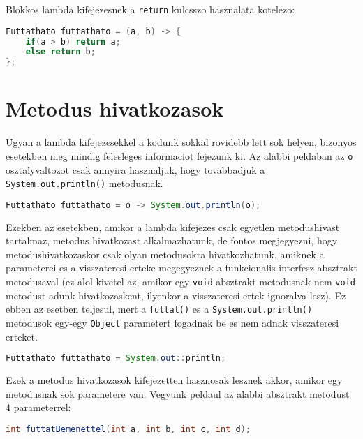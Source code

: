 \documentclass{article}
\let\l\lstinline
\begin{document}
    Blokkos lambda kifejezesnek a \l{return} kulcsszo hasznalata kotelezo:

    \begin{lstlisting}[language=Java, caption=Nem void absztrakt metodus implementalasa lambda kifejezessel]
Futtathato futtathato = (a, b) -> {
	if(a > b) return a;
	else return b;
};
    \end{lstlisting}
    \newpage


    \section{Metodus hivatkozasok}

    Ugyan a lambda kifejezesekkel a kodunk sokkal rovidebb lett sok helyen, bizonyos esetekben meg mindig felesleges informaciot fejezunk ki. Az alabbi peldaban az \l{o} osztalyvaltozot csak annyira hasznaljuk, hogy tovabbadjuk a \l{System.out.println()} metodusnak.

    \begin{lstlisting}[language=Java, caption=Parameteres absztrakt metodus implementalasa lambda kifejezessel]
Futtathato futtathato = o -> System.out.println(o);
    \end{lstlisting}

    Ezekben az esetekben, amikor a lambda kifejezes csak egyetlen metodushivast tartalmaz, metodus hivatkozast alkalmazhatunk, de fontos megjegyezni, hogy metodushivatkozaskor csak olyan metodusokra hivatkozhatunk, amiknek a parameterei es a visszateresi erteke megegyeznek a funkcionalis interfesz absztrakt metodusaval (ez alol kivetel az, amikor egy \l{void} absztrakt metodusnak nem-\l{void} metodust adunk hivatkozaskent, ilyenkor a visszateresi ertek ignoralva lesz). Ez ebben az esetben teljesul, mert a \l{futtat()} es a \l{System.out.println()} metodusok egy-egy \l{Object} parametert fogadnak be es nem adnak visszateresi erteket.

    \begin{lstlisting}[language=Java, caption=Metodus hivatkozas]
Futtathato futtathato = System.out::println;
    \end{lstlisting}

    Ezek a metodus hivatkozasok kifejezetten hasznosak lesznek akkor, amikor egy metodusnak sok parametere van. Vegyunk peldaul az alabbi absztrakt metodust 4 parameterrel:

    \begin{lstlisting}[language=Java, caption=Absztrakt metodus 4 parameterrel]
int futtatBemenettel(int a, int b, int c, int d);
    \end{lstlisting}
\end{document}
